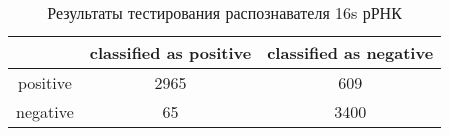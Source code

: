 \begin{table}[h]
\begin{center}
  \begin{tabular}{ | c | c | c |}
    \hline
    & classified as positive & classified as negative \\
    \hline
    positive & 2965 & 609 \\
    \hline
    negative & 65 & 3400 \\
    \hline
  \end{tabular}
\end{center}
\caption{Результаты тестирования распознавателя 16s рРНК}
\label{16s}
\end{table}